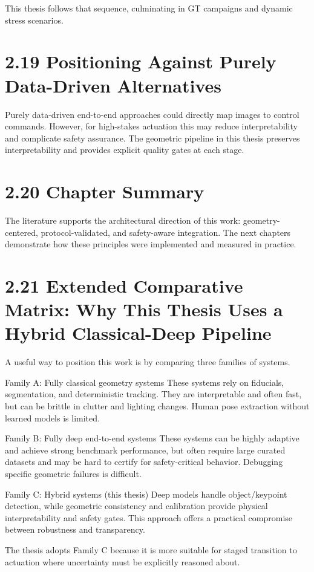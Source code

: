 This thesis follows that sequence, culminating in GT campaigns and dynamic stress scenarios.

\section{2.19 Positioning Against Purely Data-Driven Alternatives}
Purely data-driven end-to-end approaches could directly map images to control commands. However, for high-stakes actuation this may reduce interpretability and complicate safety assurance. The geometric pipeline in this thesis preserves interpretability and provides explicit quality gates at each stage.

\section{2.20 Chapter Summary}
The literature supports the architectural direction of this work: geometry-centered, protocol-validated, and safety-aware integration. The next chapters demonstrate how these principles were implemented and measured in practice.



\section{2.21 Extended Comparative Matrix: Why This Thesis Uses a Hybrid Classical-Deep Pipeline}
A useful way to position this work is by comparing three families of systems.

Family A: Fully classical geometry systems  
These systems rely on fiducials, segmentation, and deterministic tracking. They are interpretable and often fast, but can be brittle in clutter and lighting changes. Human pose extraction without learned models is limited.

Family B: Fully deep end-to-end systems  
These systems can be highly adaptive and achieve strong benchmark performance, but often require large curated datasets and may be hard to certify for safety-critical behavior. Debugging specific geometric failures is difficult.

Family C: Hybrid systems (this thesis)  
Deep models handle object/keypoint detection, while geometric consistency and calibration provide physical interpretability and safety gates. This approach offers a practical compromise between robustness and transparency.

The thesis adopts Family C because it is more suitable for staged transition to actuation where uncertainty must be explicitly reasoned about.


